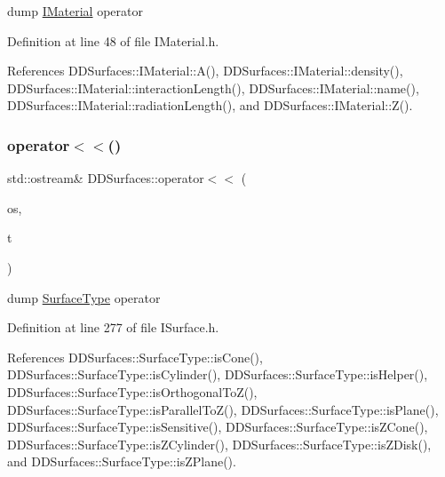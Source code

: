 dump \hyperlink{class_d_d_surfaces_1_1_i_material}{I\+Material} operator 



Definition at line 48 of file I\+Material.\+h.



References D\+D\+Surfaces\+::\+I\+Material\+::\+A(), D\+D\+Surfaces\+::\+I\+Material\+::density(), D\+D\+Surfaces\+::\+I\+Material\+::interaction\+Length(), D\+D\+Surfaces\+::\+I\+Material\+::name(), D\+D\+Surfaces\+::\+I\+Material\+::radiation\+Length(), and D\+D\+Surfaces\+::\+I\+Material\+::\+Z().

\hypertarget{namespace_d_d_surfaces_abb03d1e9cbbd691e8e30c541e5f9df8a}{}\label{namespace_d_d_surfaces_abb03d1e9cbbd691e8e30c541e5f9df8a} 
\subsubsection{\texorpdfstring{operator$<$$<$()}{operator<<()}\hspace{0.1cm}{\footnotesize\ttfamily [2/4]}}
{\footnotesize\ttfamily std\+::ostream\& D\+D\+Surfaces\+::operator$<$$<$ (\begin{DoxyParamCaption}\item[{std\+::ostream \&}]{os,  }\item[{const \hyperlink{class_d_d_surfaces_1_1_surface_type}{Surface\+Type} \&}]{t }\end{DoxyParamCaption})\hspace{0.3cm}{\ttfamily [inline]}}



dump \hyperlink{class_d_d_surfaces_1_1_surface_type}{Surface\+Type} operator 



Definition at line 277 of file I\+Surface.\+h.



References D\+D\+Surfaces\+::\+Surface\+Type\+::is\+Cone(), D\+D\+Surfaces\+::\+Surface\+Type\+::is\+Cylinder(), D\+D\+Surfaces\+::\+Surface\+Type\+::is\+Helper(), D\+D\+Surfaces\+::\+Surface\+Type\+::is\+Orthogonal\+To\+Z(), D\+D\+Surfaces\+::\+Surface\+Type\+::is\+Parallel\+To\+Z(), D\+D\+Surfaces\+::\+Surface\+Type\+::is\+Plane(), D\+D\+Surfaces\+::\+Surface\+Type\+::is\+Sensitive(), D\+D\+Surfaces\+::\+Surface\+Type\+::is\+Z\+Cone(), D\+D\+Surfaces\+::\+Surface\+Type\+::is\+Z\+Cylinder(), D\+D\+Surfaces\+::\+Surface\+Type\+::is\+Z\+Disk(), and D\+D\+Surfaces\+::\+Surface\+Type\+::is\+Z\+Plane().

